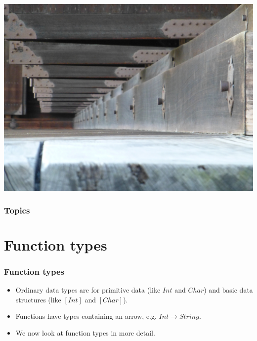 \documentclass{beamer}
\begin{document}
\begin{frame}
  \PresentationTitleSlide
\end{frame}
\begin{frame}
\begin{center}
\includegraphics[scale=0.375]
    {figures/jpg/pic07.jpg}
\end{center}
\end{frame}


\begin{frame}
  \frametitle{Topics}
  \tableofcontents
\end{frame}

\section{Function types}

\begin{frame}
\frametitle{Function types}

\begin{itemize}
\item Ordinary data types are for primitive data (like $Int$ and
  $Char$) and basic data structures (like $[Int]$ and $[Char]$).
\item Functions have types containing an arrow, e.g. $Int \rightarrow
  String$.
\item We now look at function types in more detail.
\end{itemize}

\end{frame}
\end{document}
